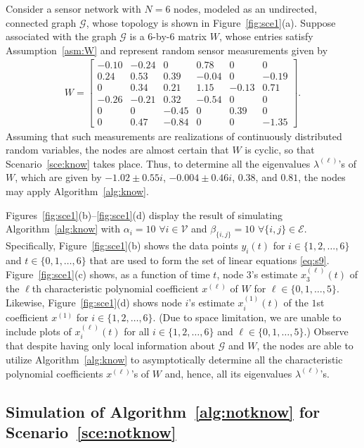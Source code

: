 \documentclass[11pt]{article}
\theoremstyle{plain}
\theoremstyle{definition}
\theoremstyle{remark}
\begin{document}
Consider a sensor network with $N=6$ nodes, modeled as an undirected, connected graph $\mathcal{G}$, whose topology is shown in Figure~\ref{fig:sce1}(a). Suppose associated with the graph $\mathcal{G}$ is a $6$-by-$6$ matrix $W$, whose entries satisfy Assumption~\ref{asm:W} and represent random sensor measurements given by
\begin{align*}
W=\begin{bmatrix}-0.10 & -0.24 & 0 & 0.78 & 0 & 0\\ 0.24 & 0.53 & 0.39 & -0.04 & 0 & -0.19\\ 0 & 0.34 & 0.21 & 1.15 & -0.13 & 0.71\\-0.26 & -0.21 & 0.32 & -0.54 & 0 & 0\\ 0 & 0 & -0.45 & 0 & 0.39 & 0\\ 0 & 0.47 & -0.84 & 0 & 0 & -1.35\end{bmatrix}.
\end{align*}
Assuming that such measurements are realizations of continuously distributed random variables, the nodes are almost certain that $W$ is cyclic, so that Scenario~\ref{sce:know} takes place. Thus, to determine all the eigenvalues $\lambda^{(\ell)}$'s of $W$, which are given by $-1.02\pm0.55i$, $-0.004\pm0.46i$, $0.38$, and $0.81$, the nodes may apply Algorithm~\ref{alg:know}.

Figures~\ref{fig:sce1}(b)--\ref{fig:sce1}(d) display the result of simulating Algorithm~\ref{alg:know} with $\alpha_i=10$ $\forall i\in\mathcal{V}$ and $\beta_{\{i,j\}}=10$ $\forall\{i,j\}\in\mathcal{E}$. Specifically, Figure~\ref{fig:sce1}(b) shows the data points $y_i(t)$ for $i\in\{1,2,\ldots,6\}$ and $t\in\{0,1,\ldots,6\}$ that are used to form the set of linear equations \eqref{eq:s9}. Figure~\ref{fig:sce1}(c) shows, as a function of time $t$, node $3$'s estimate $x_3^{(\ell)}(t)$ of the $\ell$th characteristic polynomial coefficient $x^{(\ell)}$ of $W$ for $\ell\in\{0,1,\ldots,5\}$. Likewise, Figure~\ref{fig:sce1}(d) shows node $i$'s estimate $x_i^{(1)}(t)$ of the $1$st coefficient $x^{(1)}$ for $i\in\{1,2,\ldots,6\}$. (Due to space limitation, we are unable to include plots of $x_i^{(\ell)}(t)$ for all $i\in\{1,2,\ldots,6\}$ and $\ell\in\{0,1,\ldots,5\}$.) Observe that despite having only local information about $\mathcal{G}$ and $W$, the nodes are able to utilize Algorithm~\ref{alg:know} to asymptotically determine all the characteristic polynomial coefficients $x^{(\ell)}$'s of $W$ and, hence, all its eigenvalues $\lambda^{(\ell)}$'s.

\subsection{Simulation of Algorithm~\ref{alg:notknow} for Scenario~\ref{sce:notknow}}\label{ssec:simualgoscennotknow}
\end{document}
